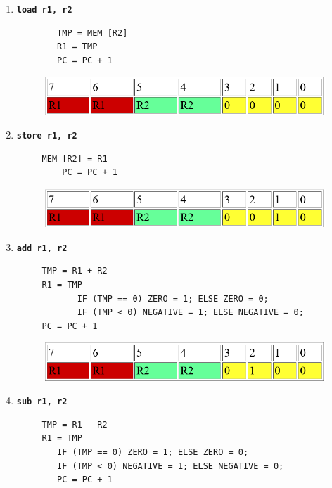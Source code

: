 \documentclass[../notes.tex]{subfiles}
\begin{document}
\begin{enumerate}
	\item \textbf{\texttt{load r1, r2}}
		\begin{listing}[H]
		\begin{verbatim}
		TMP = MEM [R2]
		R1 = TMP
		PC = PC + 1
		\end{verbatim}
		\end{listing}

		\begin{figure}[H]
			\centering
			\includegraphics[width=0.8\linewidth]{img/image_2022-11-03-14-54-07.png}
		\end{figure}
		
	\item \textbf{\texttt{store r1, r2}}
		\begin{listing}[H]
		\begin{verbatim}
     MEM [R2] = R1
		 PC = PC + 1
		\end{verbatim}
		\end{listing}
		\begin{figure}[H]
			\centering
			\includegraphics[width=0.8\linewidth]{img/image_2022-11-03-14-54-23.png}
		\end{figure}
	\item \textbf{\texttt{add r1, r2}}
		\begin{listing}[H]
		\begin{verbatim}
     TMP = R1 + R2
     R1 = TMP
			IF (TMP == 0) ZERO = 1; ELSE ZERO = 0;
			IF (TMP < 0) NEGATIVE = 1; ELSE NEGATIVE = 0;
     PC = PC + 1
		\end{verbatim}
		\end{listing}
		\begin{figure}[H]
			\centering
			\includegraphics[width=0.8\linewidth]{img/image_2022-11-03-14-54-35.png}
		\end{figure}

	\item \textbf{\texttt{sub r1, r2}}
		\begin{listing}[H]
		\begin{verbatim}
     TMP = R1 - R2
     R1 = TMP
		IF (TMP == 0) ZERO = 1; ELSE ZERO = 0;
		IF (TMP < 0) NEGATIVE = 1; ELSE NEGATIVE = 0;
		PC = PC + 1
		\end{verbatim}
		\end{listing}


\end{enumerate}
\end{document}
